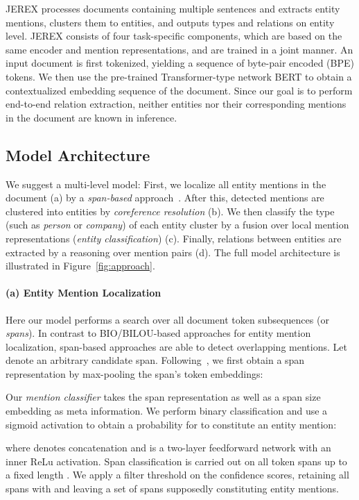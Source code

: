 \documentclass[11pt,a4paper]{article}
\newcommand\name{JEREX}
\begin{document}
\name{} processes documents containing multiple sentences and extracts entity mentions, clusters them to entities, and outputs types and relations on entity level. \name{} consists of four task-specific components, which are based on the same encoder and mention representations, and are trained in a joint manner. An input document is first tokenized, yielding a sequence of   byte-pair encoded (BPE) \cite{sennrich:2016:bpe} tokens. We then use the pre-trained Transformer-type network BERT \cite{devlin:2018:bert} to obtain a contextualized embedding sequence  of the document. Since our goal is to perform end-to-end relation extraction, neither entities nor their corresponding mentions in the document are known in inference. 

\subsection{Model Architecture}
We suggest a multi-level model: First, we localize all entity mentions in the document (a) by a \emph{span-based} approach~\cite{lee:2017:span_coreference}. After this, detected mentions are clustered into entities by \emph{coreference resolution} (b). We then classify the type (such as \emph{person} or \emph{company}) of each entity cluster by a fusion over local mention representations (\emph{entity classification}) (c). Finally, relations between entities are extracted by a reasoning over mention pairs (d). The full model architecture is illustrated in Figure~\ref{fig:approach}.

\paragraph{(a) Entity Mention Localization} Here our model performs a search over all document token subsequences (or \emph{spans}). In contrast to BIO/BILOU-based approaches for entity mention localization, span-based approaches are able to detect overlapping mentions. Let   denote an arbitrary candidate span. Following~\citet{eberts:2020:spert}, we first obtain a span representation by max-pooling the span's token embeddings: 

Our \emph{mention classifier} takes the span representation  as well as a span size embedding  \cite{lee:2017:span_coreference} as meta information. We perform binary classification and use a sigmoid activation to obtain a probability for  to constitute an entity mention: 

where  denotes concatenation and  is a two-layer feedforward network with an inner ReLu activation.
Span classification is carried out on all token spans up to a fixed length . We apply a filter threshold  on the confidence scores, retaining all spans with  and  leaving a set  of spans supposedly constituting entity mentions.
\end{document}
